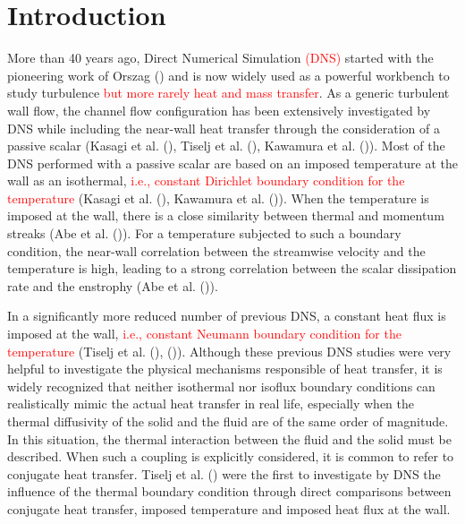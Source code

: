 \documentclass[review]{elsarticle}
\begin{document}
\linenumbers

\section{Introduction}
More than 40 years ago, Direct Numerical Simulation \textcolor{red}{(DNS)} started with the pioneering work of Orszag (\cite{Orszag1970analytical}) and is now widely used as a powerful workbench to study turbulence \textcolor{red}{but more rarely heat and mass transfer}.
As a generic turbulent wall flow, the channel flow configuration has been extensively investigated by DNS while including the near-wall heat transfer through the consideration of a passive scalar (Kasagi et al. (\cite{kasagi1992direct}), Tiselj et al. (\cite{Tiselj2001dns}), Kawamura et al. (\cite{kawamura1998dns})).
Most of the DNS performed with a passive scalar are based on an imposed temperature at the wall as an isothermal, \textcolor{red}{i.e., constant Dirichlet boundary condition for the temperature} (Kasagi et al. (\cite{kasagi1992direct}), Kawamura et al. (\cite{kawamura1998dns})).
When the temperature is imposed at the wall, there is a close similarity between thermal and momentum streaks (Abe et al. (\cite{abe2009near})).
For a temperature subjected to such a boundary condition, the near-wall correlation between the streamwise velocity and the temperature is high, leading to a strong correlation between the scalar dissipation rate and the enstrophy (Abe et al. (\cite{abe2009correlation})).

In a significantly more reduced number of previous DNS, a constant heat flux is imposed at the wall, \textcolor{red}{i.e., constant Neumann boundary condition for the temperature} (Tiselj et al. (\cite{Tiselj2001dns}), (\cite{tiselj2001effect})).
Although these previous DNS studies were very helpful to investigate the physical mechanisms responsible of heat transfer, it is widely recognized that neither isothermal nor isoflux boundary conditions can realistically mimic the actual heat transfer in real life, especially when the thermal diffusivity of the solid and the fluid are of the same order of magnitude.
In this situation, the thermal interaction between the fluid and the solid must be described.
When such a coupling is explicitly considered, it is common to refer to conjugate heat transfer.
Tiselj et al. (\cite{Tiselj2001dns}) were the first to investigate by DNS the influence of the thermal boundary condition through direct comparisons between conjugate heat transfer, imposed temperature and imposed heat flux at the wall.
\end{document}
